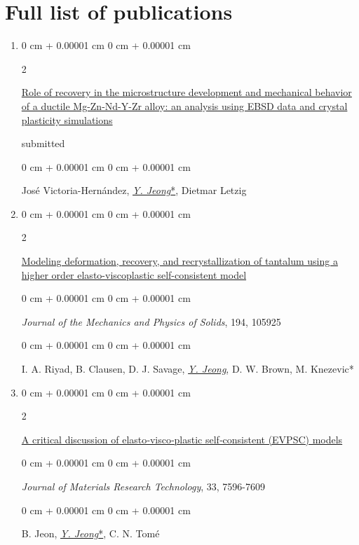 \documentclass[10pt, letterpaper]{article}
\newenvironment{onecolentry}{
    \begin{adjustwidth}{
        0 cm + 0.00001 cm
    }{
        0 cm + 0.00001 cm
    }
}{
    \end{adjustwidth}
} %
\newenvironment{twocolentry}[2][]{
    \onecolentry
    \def\secondColumn{#2}
    \setcolumnwidth{\fill, 4.5 cm}
    \begin{paracol}{2}
}{
    \switchcolumn \raggedleft \secondColumn
    \end{paracol}
    \endonecolentry
} %
\begin{document}
    \section{Full list of publications}
    \begin{enumerate}
        \item
        \begin{twocolentry}{submitted}
            \href{}{Role of recovery in the microstructure development and mechanical behavior of a ductile Mg-Zn-Nd-Y-Zr alloy: an analysis using EBSD data and crystal plasticity simulations}
        \end{twocolentry}
        \begin{onecolentry}
            José Victoria-Hernández, {\underline{\textit{Y. Jeong}*}}, Dietmar Letzig
        \end{onecolentry}
        \vspace{0.10 cm}


        \item
        \begin{twocolentry}{2025}
            \href{https://doi.org/10.1016/j.jmps.2024.105925}{Modeling deformation, recovery, and recrystallization of tantalum using a higher order elasto-viscoplastic self-consistent model}
        \end{twocolentry}
        \begin{onecolentry}
            {\it Journal of the Mechanics and Physics of Solids}, 194, 105925
        \end{onecolentry}
        \begin{onecolentry}
            I. A. Riyad, B. Clausen, D. J. Savage, {\underline{\textit{Y. Jeong}}}, D. W. Brown, M. Knezevic*
        \end{onecolentry}
        \vspace{0.10 cm}

        \item
        \begin{twocolentry}{2024}
            \href{https://doi.org/10.1016/j.jmrt.2024.11.043}{A critical discussion of elasto‑visco‑plastic self‑consistent (EVPSC) models}
        \end{twocolentry}
        \begin{onecolentry}
            {\it Journal of Materials Research Technology}, 33, 7596-7609
        \end{onecolentry}
        \begin{onecolentry}
            B. Jeon, {\underline{\textit{Y. Jeong}*}}, C. N. Tomé
        \end{onecolentry}
        \vspace{0.10 cm}


\end{enumerate}
\end{document}
